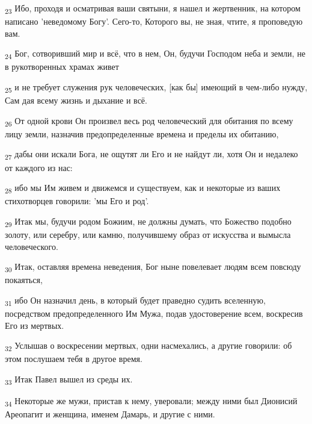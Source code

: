 \begin{tcolorbox}
\textsubscript{23} Ибо, проходя и осматривая ваши святыни, я нашел и жертвенник, на котором написано 'неведомому Богу'. Сего-то, Которого вы, не зная, чтите, я проповедую вам.
\end{tcolorbox}
\begin{tcolorbox}
\textsubscript{24} Бог, сотворивший мир и всё, что в нем, Он, будучи Господом неба и земли, не в рукотворенных храмах живет
\end{tcolorbox}
\begin{tcolorbox}
\textsubscript{25} и не требует служения рук человеческих, [как бы] имеющий в чем-либо нужду, Сам дая всему жизнь и дыхание и всё.
\end{tcolorbox}
\begin{tcolorbox}
\textsubscript{26} От одной крови Он произвел весь род человеческий для обитания по всему лицу земли, назначив предопределенные времена и пределы их обитанию,
\end{tcolorbox}
\begin{tcolorbox}
\textsubscript{27} дабы они искали Бога, не ощутят ли Его и не найдут ли, хотя Он и недалеко от каждого из нас:
\end{tcolorbox}
\begin{tcolorbox}
\textsubscript{28} ибо мы Им живем и движемся и существуем, как и некоторые из ваших стихотворцев говорили: 'мы Его и род'.
\end{tcolorbox}
\begin{tcolorbox}
\textsubscript{29} Итак мы, будучи родом Божиим, не должны думать, что Божество подобно золоту, или серебру, или камню, получившему образ от искусства и вымысла человеческого.
\end{tcolorbox}
\begin{tcolorbox}
\textsubscript{30} Итак, оставляя времена неведения, Бог ныне повелевает людям всем повсюду покаяться,
\end{tcolorbox}
\begin{tcolorbox}
\textsubscript{31} ибо Он назначил день, в который будет праведно судить вселенную, посредством предопределенного Им Мужа, подав удостоверение всем, воскресив Его из мертвых.
\end{tcolorbox}
\begin{tcolorbox}
\textsubscript{32} Услышав о воскресении мертвых, одни насмехались, а другие говорили: об этом послушаем тебя в другое время.
\end{tcolorbox}
\begin{tcolorbox}
\textsubscript{33} Итак Павел вышел из среды их.
\end{tcolorbox}
\begin{tcolorbox}
\textsubscript{34} Некоторые же мужи, пристав к нему, уверовали; между ними был Дионисий Ареопагит и женщина, именем Дамарь, и другие с ними.
\end{tcolorbox}
